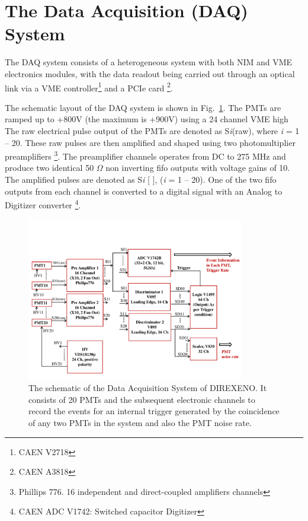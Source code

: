 \section{The Data Acquisition (DAQ) System }
\label{sec:DAQ}


The DAQ system consists of a heterogeneous system with both 
NIM and VME electronics modules, with the data readout being carried out 
through an optical link via a VME controller\footnote{CAEN V2718} and a 
PCIe card \footnote{CAEN A3818}. 

The schematic layout of the DAQ system is shown in Fig.~{\ref{Fig:DAQscheme}}. 
The PMTs are ramped up to +800V (the maximum is +900V) using a 24 channel VME high 
The raw electrical pulse output of the PMTs are denoted as S{\it i}(raw), where {\it i} = 1 -- 20. 
These raw pulses are then amplified and shaped using two photomultiplier preamplifiers 
\footnote{Phillips 776. 16 independent and direct-coupled amplifiers channels}. 
The preamplifier channels operates from DC to 275 MHz and produce two identical 
50 $\Omega$ non inverting fifo outputs with voltage gains of 10. 
The amplified pulses are denoted as S{\it i} 
[ ], 
({\it i} = 1 -- 20). One of the two fifo outputs from each channel is converted to a 
digital signal with an Analog to Digitizer converter \footnote{CAEN ADC V1742: Switched capacitor Digitizer}. 

\begin{figure}[h]
   \centering
   \includegraphics[width=0.85\textwidth]{DAQscheme.pdf}
   \caption{The schematic of the Data Acquisition System of DIREXENO. It 
        consists of 20 PMTs and the subsequent electronic channels to record 
        the events for an internal trigger generated by the coincidence of any 
        two PMTs in the system and also the PMT noise rate.}
   \label{Fig:DAQscheme}
\end{figure}

